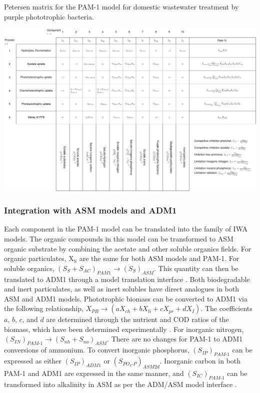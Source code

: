  \begin{table}
    \caption{Petersen matrix for the PAM-1 model for domestic wastewater treatment by purple phototrophic bacteria.}
    \label{tab:petersen}
    \includegraphics[width=1\linewidth]{Tables/petersen/petersen.pdf}
\end{table}

\subsubsection{Integration with ASM models and ADM1}
Each component in the PAM-1 model can be translated into the family of IWA models. The organic compounds in this model can be transformed to ASM organic substrate by combining the acetate and other soluble organics fields. For organic particulates, $\mathrm{X_S}$ are the same for both ASM models and PAM-1. For soluble organics, $\left(S_S + S_{AC}\right)_{PAM1} \rightarrow \left(S_S\right)_{ASM}$. This quantity can then be translated to ADM1 through a model translation interface \cite{nopens2009}. Both biodegradable and inert particulates, as well as inert solubles have direct analogues in both ASM and ADM1 models. Phototrophic biomass can be converted to ADM1 via the following relationship, $X_{PB} \rightarrow \left(aX_{ch} + bX_{li} + cX_{pr} + dX_I \right)$. The coefficients $a$, $b$, $c$, and $d$ are determined through the nutrient and COD ratios of the biomass, which have been determined experimentally \cite{hulsen2014}. For inorganic nitrogen, $\left(S_{IN}\right)_{PAM\mbox{-}1} \rightarrow \left(S_{nh} + S_{no}\right)_{ASM}$. There are no changes for PAM-1 to ADM1 conversions of ammonium. To convert inorganic phosphorus, $\left(S_{IP}\right)_{PAM\mbox{-}1}$ can be expressed as either $\left(S_{IP}\right)_{ADM1}$ or $\left(S_{PO_4\mbox{-}P}\right)_{ASM2d}$. Inorganic carbon in both PAM-1 and ADM1 are expressed in the same manner, and $\left(S_{IC}\right)_{PAM\mbox{-}1}$ can be transformed into alkalinity in ASM as per the ADM/ASM model interface \cite{nopens2009}.

